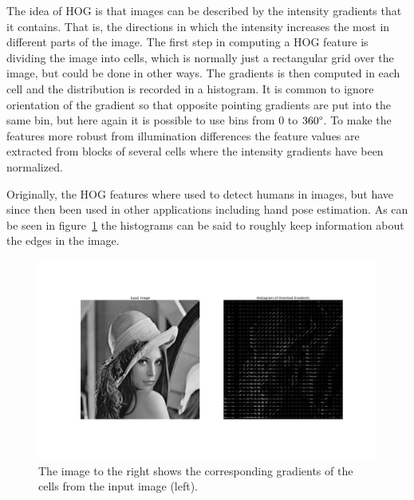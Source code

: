 \documentclass[a4paper,11pt]{kth-mag}
\begin{document}
The idea of HOG is that images can be described by the intensity gradients that it contains.
That is, the directions in which the intensity increases the most in different parts of the image.
The first step in computing a HOG feature is dividing the image into cells, which is normally just a rectangular grid over the image, but could be done in other ways.
The gradients is then computed in each cell and the distribution is recorded in a histogram.
It is common to ignore orientation of the gradient so that opposite pointing gradients are put into the same bin, but here again it is possible to use bins from 0 to $360\degree$.
To make the features more robust from illumination differences the feature values are extracted from blocks of several cells where the intensity gradients have been normalized.

Originally, the HOG features where used to detect humans in images\cite{HOG}, but have since then been used in other applications including hand pose estimation. 
As can be seen in figure~\ref{fig:HOG_girl} the histograms can be said to roughly keep information about the edges in the image. 

\begin{figure}
    \centering
    \includegraphics[width=\textwidth]{images/hog_lena_old.png}
    \caption{The image to the right shows the corresponding gradients of the cells from the input image (left).} 
    \label{fig:HOG_girl}
\end{figure}
\end{document}

